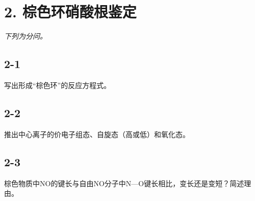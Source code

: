\section*{2. 棕色环硝酸根鉴定}
\textit{下列为分问。}

\subsection*{2-1}
写出形成“棕⾊环”的反应⽅程式。

\subsection*{2-2}
推出中⼼离⼦的价电⼦组态、⾃旋态（⾼或低）和氧化态。

\subsection*{2-3}
棕⾊物质中NO的键⻓与⾃由NO分⼦中N—O键⻓相⽐，变⻓还是变短？简述理由。
